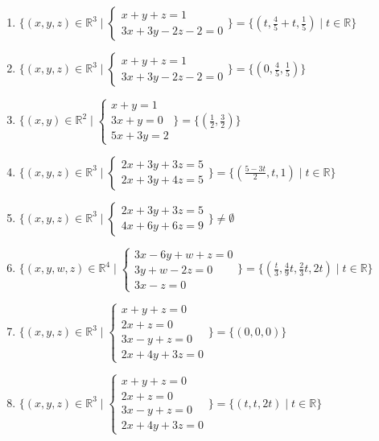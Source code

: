 \documentclass[11pt,a4paper]{article}
\begin{document}
\begin{enumerate}
\item $\displaystyle \{(x, y, z) \in \mathbb{R}^{3} \mid \begin{cases} x + y + z = 1 \\ 3x + 3y - 2z - 2 = 0 \end{cases}\} = \{(t, \frac{4}{5} + t, \frac{1}{5}) \mid t \in \mathbb{R}\}$
\item $\displaystyle \{(x, y, z) \in \mathbb{R}^{3} \mid \begin{cases} x + y + z = 1 \\ 3x + 3y - 2z - 2 = 0 \end{cases}\} = \{(0, \frac{4}{5}, \frac{1}{5})\}$
\item $\displaystyle \{(x, y) \in \mathbb{R}^{2} \mid \begin{cases} x + y = 1 \\ 3x + y = 0 \\ 5x + 3y = 2 \end{cases}\} = \{(\frac{1}{2}, \frac{3}{2})\}$
\item $\displaystyle \{(x, y, z) \in \mathbb{R}^{3} \mid \begin{cases} 2x + 3y + 3z = 5 \\ 2x + 3y + 4z = 5 \end{cases}\} = \{(\frac{5 - 3t}{2}, t, 1) \mid t \in \mathbb{R}\}$
\item $\displaystyle \{(x, y, z) \in \mathbb{R}^{3} \mid \begin{cases} 2x + 3y + 3z = 5 \\ 4x + 6y + 6z = 9 \end{cases}\} \neq \emptyset$
\item $\displaystyle \{(x, y, w, z) \in \mathbb{R}^{4} \mid \begin{cases} 3x - 6y + w + z = 0 \\ 3y + w - 2z = 0 \\ 3x - z = 0 \end{cases}\} = \{(\frac{t}{3}, \frac{4}{9} t, \frac{2}{3} t, 2t) \mid t \in \mathbb{R}\}$
\item $\displaystyle \{(x, y, z) \in \mathbb{R}^{3} \mid \begin{cases} x + y + z = 0 \\ 2x + z = 0 \\ 3x - y + z = 0 \\ 2x + 4y + 3z = 0 \end{cases}\} = \{(0, 0, 0)\}$
\item $\displaystyle \{(x, y, z) \in \mathbb{R}^{3} \mid \begin{cases} x + y + z = 0 \\ 2x + z = 0 \\ 3x - y + z = 0 \\ 2x + 4y + 3z = 0 \end{cases}\} = \{(t, t, 2t) \mid t \in \mathbb{R}\}$

\end{enumerate}
\end{document}
